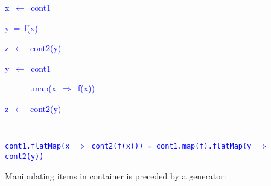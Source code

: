 \texttt{\textcolor{blue}{\footnotesize{}}}%
\begin{minipage}[c][1\totalheight][t]{0.49\columnwidth}%
\begin{lyxcode}
\textcolor{blue}{\footnotesize{}x~$\leftarrow$~cont1}{\footnotesize\par}

\textcolor{blue}{\footnotesize{}y~=~f(x)}{\footnotesize\par}

\textcolor{blue}{\footnotesize{}z~$\leftarrow$~cont2(y)}{\footnotesize\par}
\end{lyxcode}
%
\end{minipage}\texttt{\textcolor{blue}{\footnotesize{}\hfill{}}}%
\begin{minipage}[c][1\totalheight][t]{0.4\columnwidth}%
\begin{lyxcode}
\textcolor{blue}{\footnotesize{}y~$\leftarrow$~cont1}{\footnotesize\par}

\textcolor{blue}{\footnotesize{}~~~~~~.map(x~$\Rightarrow$~f(x))}{\footnotesize\par}

\textcolor{blue}{\footnotesize{}z~$\leftarrow$~cont2(y)}{\footnotesize\par}
\end{lyxcode}
%
\end{minipage}\texttt{\textcolor{blue}{\footnotesize{}\hfill{}\medskip{}
}}{\footnotesize\par}

\texttt{\textcolor{blue}{\footnotesize{}cont1.flatMap(x $\Rightarrow$
cont2(f(x))) = cont1.map(f).flatMap(y $\Rightarrow$ cont2(y))}} 

Manipulating items in container is preceded by a generator:


